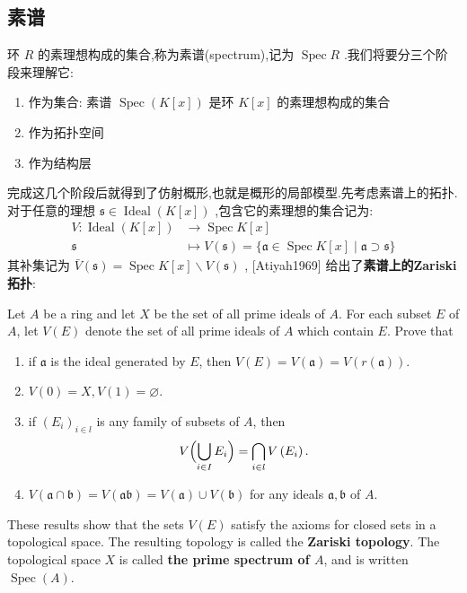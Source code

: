 \subsection{素谱}
环 $R$ 的素理想构成的集合,称为素谱(spectrum),记为 $\operatorname{Spec} R$ .我们将要分三个阶段来理解它:
\begin{enumerate}
  \item 作为集合: 素谱 $\operatorname{Spec} (K[x])$ 是环 $K[x]$ 的素理想构成的集合
  \item 作为拓扑空间
  \item 作为结构层
\end{enumerate}
完成这几个阶段后就得到了仿射概形,也就是概形的局部模型.先考虑素谱上的拓扑.对于任意的理想 $\mathfrak{s} \in \operatorname{Ideal}(K[x])$ ,包含它的素理想的集合记为:
\begin{equation}\label{eq:zero set7}
\begin{aligned}
V: \operatorname{Ideal}(K[x]) & \rightarrow \operatorname{Spec} K[x] \\
\mathfrak{s} & \mapsto V(\mathfrak{s})=\{\mathfrak{a} \in \operatorname{Spec} K[x] \mid \mathfrak{a} \supset \mathfrak{s}\}
\end{aligned}
\end{equation}
其补集记为 $\bar{V}(\mathfrak{s})=\operatorname{Spec} K[x] \backslash V(\mathfrak{s})$ ,
[Atiyah1969] 给出了\textbf{素谱上的Zariski拓扑}:
\begin{definition}
  Let $A$ be a ring and let $X$ be the set of all prime ideals of $A$. For each subset $E$ of $A$, let $V(E)$ denote the set of all prime ideals of $A$ which contain $E$. Prove that
\begin{enumerate}[label=\roman*),font=\upshape,leftmargin=1.8em,nosep]
  \item if $\mathfrak{a}$ is the ideal generated by $E$, then $V(E)=V(\mathfrak{a})=V(r(\mathfrak{a}))$.
  \item $V(0)=X, V(1)=\varnothing$.
  \item if $\left(E_i\right)_{i \in l}$ is any family of subsets of $A$, then
  \begin{align*}
  V\Bigl(\bigcup_{i \in I} E_i\Bigr)=\bigcap_{i \in l} V\left(E_i\right) .
  \end{align*}
  \item $V(\mathfrak{a} \cap \mathfrak{b})=V(\mathfrak{a} \mathfrak{b})=V(\mathfrak{a}) \cup V(\mathfrak{b})$ for any ideals $\mathfrak{a}, \mathfrak{b}$ of $A$.
\end{enumerate}

These results show that the sets $V(E)$ satisfy the axioms for closed sets in a topological space. The resulting topology is called the \textbf{Zariski topology}. The topological space $X$ is called \textbf{the prime spectrum of $A$}, and is written $\operatorname{Spec}(A)$.
\end{definition}

